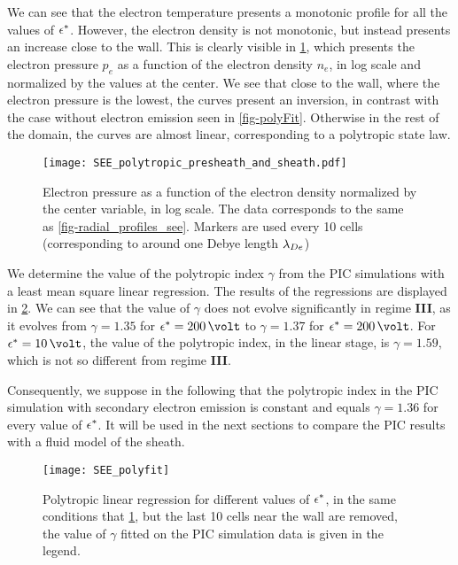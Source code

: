 We can see that the electron temperature presents a monotonic profile for all the values of $\epsilon^{*}$.
However, the electron density is not monotonic, but instead presents an increase close to the wall.
This is clearly visible in \cref{fig-log_pe-ne}, which presents the electron pressure $p_e$ as a function of the electron density $n_e$, in log scale and normalized by the values at the center.
We see that close to the wall, where the electron pressure is the lowest, the curves present an inversion, in contrast with the case without electron emission seen in \cref{fig-polyFit}.
Otherwise in the rest of the domain, the curves are almost linear, corresponding to a polytropic state law.

\begin{figure}[hbtp]
  \centering
  \texttt{[image: SEE\_polytropic\_presheath\_and\_sheath.pdf]}
  \caption{Electron pressure as a function of the electron density normalized by the center variable, in log scale. The data corresponds to the same as \cref{fig-radial_profiles_see}. Markers are used every 10 cells (corresponding to around one Debye length $\lambda_{De}$)}
  \label{fig-log_pe-ne}
\end{figure}

We determine the value of the polytropic index $\gamma$ from the \ac{PIC} simulations with a least mean square linear regression.
The results of the regressions are displayed in \cref{fig-polyfit_see}.
We can see that the value of $\gamma$ does not evolve significantly in regime {\bf III}, as it evolves from $\gamma=1.35$ for $\crover=200\,\volt$ to $\gamma=1.37$ for $\crover=200\,\volt$.
For $\crover=10\,\volt$, the value of the polytropic index, in the linear stage, is $\gamma=1.59$, which is not so different from regime {\bf III}.

Consequently, we suppose in the following that the polytropic index in the \ac{PIC} simulation with secondary electron emission is constant and equals $\gamma=1.36$ for every value of $\epsilon^{*}$.
It will be used in the next sections to compare the \ac{PIC} results with a fluid model of the sheath.

\renewcommand\subfigurewidth{3in}

\begin{figure}[hbtp]
  \centering
  \texttt{[image: SEE\_polyfit]}
  \caption{Polytropic linear regression for different values of $\epsilon^{*}$, in the same conditions that \cref{fig-log_pe-ne}, but the last 10 cells near the wall are removed, the value of $\gamma$ fitted on the \ac{PIC} simulation data is given in the legend.}
  \label{fig-polyfit_see}
\end{figure}



